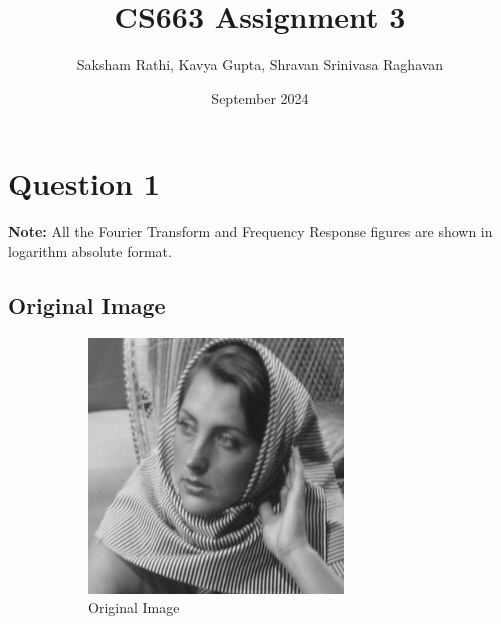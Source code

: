\documentclass[12pt]{article}
\title{{\bf CS663 Assignment 3}}
\author{Saksham Rathi, Kavya Gupta, Shravan Srinivasa Raghavan}
\date{September 2024}
\begin{document}
\maketitle
\clearpage

\section*{Question 1}

\textbf{Note:} All the Fourier Transform and Frequency Response figures are shown in logarithm absolute format.

\subsection*{Original Image}
\begin{figure}[H]
    \begin{subfigure}{.45\textwidth}
    \centering
      \includegraphics[width=1\linewidth]{../images/barbara256.png}
      \caption{Original Image}
    \end{subfigure}
    \begin{subfigure}{.5\textwidth}
    \centering

\end{subfigure}
\end{figure}
\end{document}
